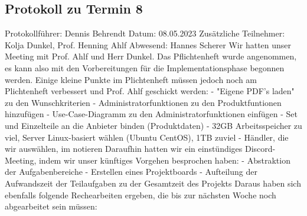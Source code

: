 \subsection{Protokoll zu Termin 8}
Protokollführer: Dennis Behrendt \newline
Datum: 08.05.2023 \newline
Zusätzliche Teilnehmer: Kolja Dunkel, Prof. Henning Ahlf \newline
Abwesend: Hannes Scherer \newline \newline
Wir hatten unser Meeting mit Prof. Ahlf und Herr Dunkel. Das Pflichtenheft wurde angenommen, es kann also mit den Vorbereitungen für die Implementationsphase begonnen werden. \newline
Einige kleine Punkte im Plichtenheft müssen jedoch noch am Plichtenheft verbessert und Prof. Ahlf geschickt werden: \newline
  - "Eigene PDF's laden" zu den Wunschkriterien \newline
  - Administratorfunktionen zu den Produktfuntionen hinzufügen \newline
  - Use-Case-Diagramm zu den Administratorfunktionen einfügen \newline
  - Set und Einzelteile an die Anbieter binden (Produktdaten) \newline
  - 32GB Arbeitsspeicher zu viel, Server Linux-basiert wählen (Ubuntu CentOS), 1TB zuviel \newline
  - Händler, die wir auswählen, im notieren \newline
Daraufhin hatten wir ein einstündiges Discord-Meeting, indem wir unser künftiges Vorgehen besprochen haben: \newline
  - Abstraktion der Aufgabenbereiche \newline
  - Erstellen eines Projektboards \newline
  - Aufteilung der Aufwandszeit der Teilaufgaben zu der Gesamtzeit des Projekts \newline
Daraus haben sich ebenfalls folgende Rechearbeiten ergeben, die bis zur nächsten Woche noch abgearbeitet sein müssen:
